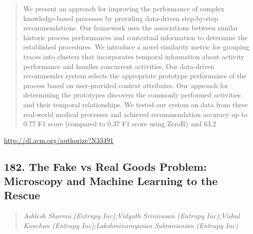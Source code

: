 \documentclass{article}
\begin{document}
\begin{quote}
We present an approach for improving the performance of complex knowledge-based processes by providing data-driven step-by-step recommendations. Our framework uses the associations between similar historic process performances and contextual information to determine the established procedures. We introduce a novel similarity metric for grouping traces into clusters that incorporates temporal information about activity performance and handles concurrent activities. Our data-driven recommender system selects the appropriate prototype performance of the process based on user-provided context attributes. Our approach for determining the prototypes discovers the commonly performed activities and their temporal relationships. We tested our system on data from three real-world medical processes and achieved recommendation accuracy up to 0.77 F1 score (compared to 0.37 F1 score using ZeroR) and 63.2%
\end{quote}

\href{http://dl.acm.org/authorize?N33491}{http://dl.acm.org/authorize?N33491}

\subsection{182. The Fake vs Real Goods Problem: Microscopy and Machine Learning to the Rescue}

\begin{quote}
\footnotesize{\textit{Ashlesh Sharma (Entrupy Inc);Vidyuth Srinivasan (Entrupy Inc);Vishal Kanchan (Entrupy Inc);Lakshminarayanan Subramanian (Entrupy Inc)}}

\end{quote}
\end{document}
